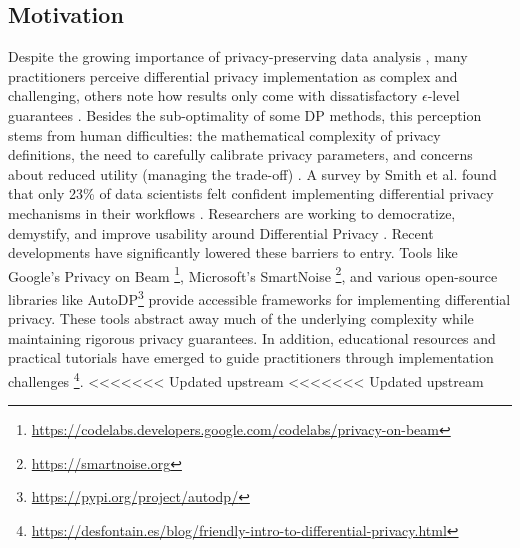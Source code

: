 \documentclass[12pt,letterpaper]{article}
\begin{document}
\subsection{Motivation}

Despite the growing importance of privacy-preserving data analysis \cite{PewPrivacy2019}, many practitioners perceive differential privacy implementation as complex and challenging, others note how results only come with dissatisfactory $\epsilon$-level guarantees \cite{FLandPrivacy}. Besides the sub-optimality of some DP methods, this perception stems from human difficulties: the mathematical complexity of privacy definitions, the need to carefully calibrate privacy parameters, and concerns about reduced utility (managing the trade-off) \cite{DP-fyML}. A survey by Smith et al. found that only 23\% of data scientists felt confident implementing differential privacy mechanisms in their workflows \cite{needed3}. Researchers are working to democratize, demystify, and improve usability around Differential Privacy \cite{DP-fyML}. Recent developments have significantly lowered these barriers to entry. Tools like Google's Privacy on Beam \footnote{\url{https://codelabs.developers.google.com/codelabs/privacy-on-beam}}, Microsoft's SmartNoise \footnote{\url{https://smartnoise.org}}, and various open-source libraries like AutoDP\footnote{\url{https://pypi.org/project/autodp/}} provide accessible frameworks for implementing differential privacy. These tools abstract away much of the underlying complexity while maintaining rigorous privacy guarantees. In addition, educational resources and practical tutorials have emerged to guide practitioners through implementation challenges \footnote{\url{https://desfontain.es/blog/friendly-intro-to-differential-privacy.html}}.
<<<<<<< Updated upstream
<<<<<<< Updated upstream


\end{document}
